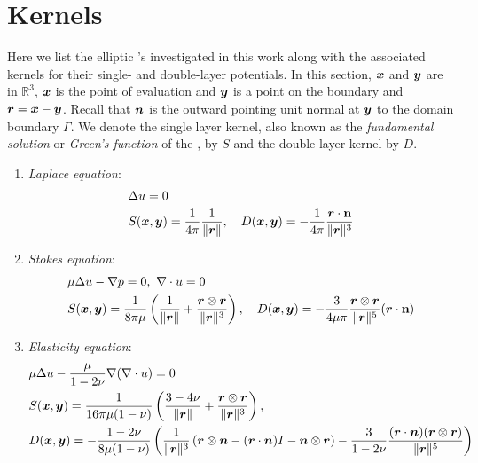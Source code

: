 
\section{Kernels\label{app:kernels}}
Here we list the elliptic \pde's investigated in this work along with the associated kernels for their single- and double-layer potentials.
In this section, ${\bm{x}}$ and ${\bm{y}}$ are in $\mathbb{R}^3$, ${\bm{x}}$ is the point of evaluation and ${\bm{y}}$ is a point on the boundary and ${\bm{r}} = {\bm{x}} - {\bm{y}}$. 
Recall that ${\bm{n}}$ is the outward pointing unit normal at ${\bm{y}}$ to the domain boundary $\Gamma$.
We denote the single layer kernel, also known as the \textit{fundamental solution} or \textit{Green's function} of the \pde, by $S$ and the double layer kernel by $D$.
\begin{enumerate}
  \item \textit{Laplace equation}:
    \begin{align*}
      &\Delta u = 0\\
      &S({\bm{x}},{\bm{y}}) = \frac{1}{4\pi}\frac{1}{\|{\bm{r}}\|}, \quad 
      D({\bm{x}}, {\bm{y}}) = - \frac{1}{4\pi} \frac{{\bm{r}} \cdot \mathbf{n}}{\|{\bm{r}}\|^3}
    \end{align*}
  \item \textit{Stokes equation}:
    \begin{align*}
      &\mu\Delta u - \nabla p = 0, \,\, \nabla \cdot u = 0\\
      &S({\bm{x}},{\bm{y}}) = \frac{1}{8\pi\mu}\left( \frac{1}{\|{\bm{r}}\|} + \frac{{\bm{r}} \otimes{\bm{r}}}{\|{\bm{r}}\|^3}\right), \quad 
      D({\bm{x}}, {\bm{y}}) = - \frac{3}{4\mu\pi} \frac{{\bm{r}} \otimes{\bm{r}}}{\|{\bm{r}}\|^5}({\bm{r}} \cdot \mathbf{n})
    \end{align*}
  \item \textit{Elasticity equation}:
    \begin{align*}
      &\mu\Delta u - \frac{\mu}{1-2\nu}\nabla(\nabla \cdot u) = 0\\
      &S({\bm{x}},{\bm{y}}) = \frac{1}{16\pi\mu(1-\nu)}\left( \frac{3-4\nu}{\|{\bm{r}}\|} + \frac{{\bm{r}} \otimes{\bm{r}}}{\|{\bm{r}}\|^3}\right), \\
      &D({\bm{x}}, {\bm{y}}) = - \frac{1-2\nu}{8\mu(1-\nu)} \left(
      \frac{1}{\|{\bm{r}}\|^3} \left(
      {\bm{r}} \otimes {\bm{n}} - ({\bm{r}}\cdot{\bm{n}}) I - {\bm{n}} \otimes {\bm{r}} 
      \right) - \frac{3}{1-2\nu}
      \frac{({\bm{r}}\cdot{\bm{n}}) ({\bm{r}} \otimes {\bm{r}})}{\|{\bm{r}}\|^5}
      \right)
    \end{align*}
\end{enumerate}
